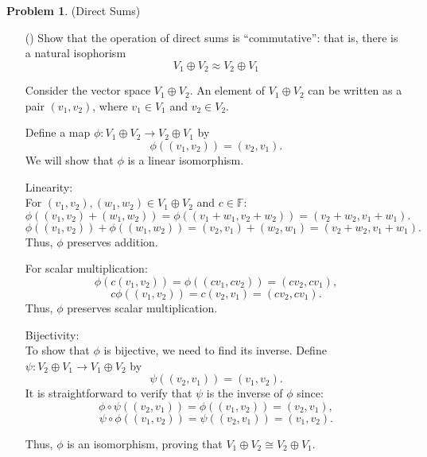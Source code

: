 \documentclass[12pt]{article}
\theoremstyle{definition}
\newtheorem{problem}{Problem}
\newcounter{subq}[problem]
\newenvironment{subproblem}
{\refstepcounter{subq} \begin{itemize} \item[(\alph{subq})]}
{\end{itemize} \medskip}
\begin{document}
\begin{problem}
    (Direct Sums)

    \begin{subproblem}
        Show that the operation of direct sums is ``commutative'': that is, there is a natural isophorism
        \[V_1 \oplus V_2 \approx V_2 \oplus V_1\]

        \begin{solution}
            Consider the vector space \( V_1 \oplus V_2 \). An element of \( V_1 \oplus V_2 \) can be written as a pair \( (v_1, v_2) \), where \( v_1 \in V_1 \) and \( v_2 \in V_2 \). 
    
            Define a map \( \phi: V_1 \oplus V_2 \to V_2 \oplus V_1 \) by
            \[        \phi((v_1, v_2)) = (v_2, v_1).        \]
            We will show that \( \phi \) is a linear isomorphism.
    
            Linearity:\\
            For \( (v_1, v_2), (w_1, w_2) \in V_1 \oplus V_2 \) and \( c \in \mathbb{F} \):
            \[
            \phi((v_1, v_2) + (w_1, w_2)) = \phi((v_1 + w_1, v_2 + w_2)) = (v_2 + w_2, v_1 + w_1).
            \]
            \[
            \phi((v_1, v_2)) + \phi((w_1, w_2)) = (v_2, v_1) + (w_2, w_1) = (v_2 + w_2, v_1 + w_1).
            \]
            Thus, \( \phi \) preserves addition. 
    
            For scalar multiplication:
            \[
            \phi(c(v_1, v_2)) = \phi((cv_1, cv_2)) = (cv_2, cv_1),
            \]
            \[
            c \phi((v_1, v_2)) = c (v_2, v_1) = (cv_2, cv_1).
            \]
            Thus, \( \phi \) preserves scalar multiplication.
    
            Bijectivity:\\
            To show that \( \phi \) is bijective, we need to find its inverse. Define \( \psi: V_2 \oplus V_1 \to V_1 \oplus V_2 \) by
            \[
            \psi((v_2, v_1)) = (v_1, v_2).
            \]
            It is straightforward to verify that \( \psi \) is the inverse of \( \phi \) since:
            \[
            \phi \circ \psi((v_2, v_1)) = \phi((v_1, v_2)) = (v_2, v_1),
            \]
            \[
            \psi \circ \phi((v_1, v_2)) = \psi((v_2, v_1)) = (v_1, v_2).
            \]
    
            Thus, \( \phi \) is an isomorphism, proving that \( V_1 \oplus V_2 \cong V_2 \oplus V_1 \).
        \end{solution}
    \end{subproblem}


\end{problem}
\end{document}
